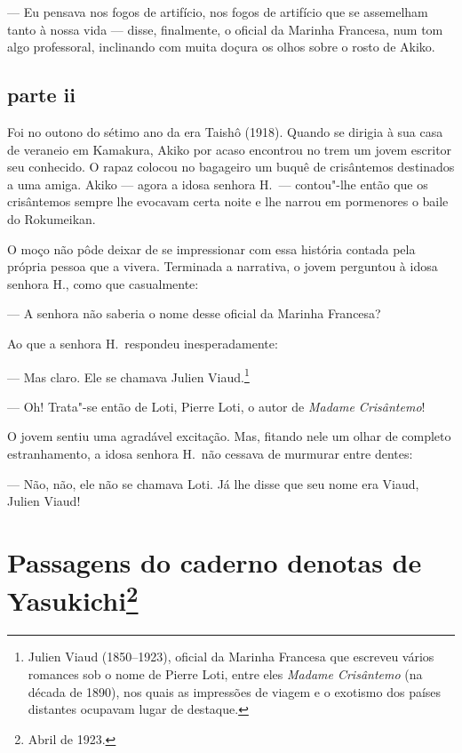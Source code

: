 --- Eu pensava nos fogos de artifício, nos fogos de artifício que se
assemelham tanto à nossa vida --- disse, finalmente, o oficial da Marinha
Francesa, num tom algo professoral, inclinando com muita doçura os
olhos sobre o rosto de Akiko.

\section*{parte ii}

Foi no outono do sétimo ano da era Taishô (1918). Quando se dirigia à
sua casa de veraneio em Kamakura, Akiko por acaso encontrou no trem um
jovem escritor seu conhecido. O rapaz colocou no bagageiro um buquê de
crisântemos destinados a uma amiga. Akiko --- agora a idosa senhora H.~---
contou"-lhe então que os crisântemos sempre lhe evocavam certa noite e
lhe narrou em pormenores o baile do Rokumeikan. 

O moço não pôde deixar de se impressionar com essa história contada 
pela própria pessoa que a vivera. Terminada a narrativa, o jovem 
perguntou à idosa senhora H., como que casualmente:

--- A senhora não saberia o nome desse oficial da Marinha Francesa?

Ao que a senhora H.~respondeu inesperadamente:

--- Mas claro. Ele se chamava Julien Viaud.\footnote{ Julien Viaud
(1850--1923), oficial da Marinha Francesa que escreveu vários romances
sob o nome de Pierre Loti, entre eles \textit{Madame Crisântemo} (na
década de 1890), nos quais as impressões de viagem e o exotismo dos
países distantes ocupavam lugar de destaque.}

--- Oh! Trata"-se então de Loti, Pierre Loti, o autor de \textit{Madame
Crisântemo}! 


O jovem sentiu uma agradável excitação. Mas, fitando nele
um olhar de completo estranhamento, a idosa senhora H.~não cessava de
murmurar entre dentes:

--- Não, não, ele não se chamava Loti. Já lhe disse que seu nome era
Viaud, Julien Viaud!


\chapter[Passagens do caderno de notas de Yasukichi]{Passagens do caderno de\break notas de Yasukichi\footnote{Abril de 1923.}}

